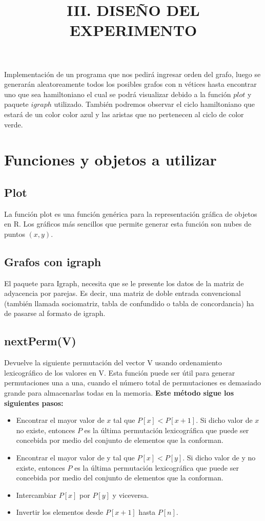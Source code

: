 \documentclass{article}
\title{III. DISEÑO DEL EXPERIMENTO}
\author{ }
\date{}
\begin{document}
\setlength{\parskip}{0mm}
\maketitle
Implementaci{\'o}n  de un programa que nos pedir{\'a} ingresar orden del grafo, luego
se generar{\'a}n aleatoreamente todos los posibles grafos con n v{\'e}tices hasta encontrar uno que sea hamiltoniano el cual se podr{\'a} visualizar debido a la funci{\'o}n $plot$ y paquete $igraph$ utilizado. También podremos observar el ciclo hamiltoniano que estar{\'a} de un color color azul y las aristas que no pertenecen al ciclo de color verde.

\section{Funciones y objetos a utilizar}
\subsection{Plot} La funci{\'o}n plot es una funci{\'o}n gen{\'e}rica para la representación gr{\'a}fica de objetos en R. Los gr{\'a}ficos m{\'a}s sencillos que permite generar esta funci{\'o}n son nubes de puntos $(x, y)$.
\subsection{Grafos con igraph}
El paquete para Igraph, necesita que se le presente los datos de la matriz de adyacencia por parejas. Es decir, una matriz de doble entrada convencional (tambi{\'e}n llamada sociomatriz, tabla de confundido o tabla de concordancia) ha de pasarse al formato de igraph.
\subsection{nextPerm(V)}
Devuelve la siguiente permutaci{\'o}n del vector V usando ordenamiento lexicogr{\'a}fico de los valores en V. 
 Esta funci{\'o}n puede ser {\'u}til para generar permutaciones una a una, cuando el n{\'u}mero total de permutaciones es demasiado grande para almacenarlas todas en la memoria.
 \newline  
 \newline
\textbf{Este m{\'e}todo sigue los siguientes pasos:}
\begin{itemize}
    \item Encontrar el mayor valor de $x$ tal que $P[x] < P[x+1]$. Si dicho valor de $x$ no existe, entonces $P$ es la {\'u}ltima permutaci{\'o}n lexicogr{\'a}fica que puede ser concebida por medio del conjunto de elementos que la conforman.
    \item Encontrar el mayor valor de y tal que $P[x]<P[y]$. Si dicho valor de y no existe, entonces $P$ es la {\'u}ltima permutaci{\'o}n lexicogr{\'a}fica que puede ser concebida por medio del conjunto de elementos que la conforman.
    \item Intercambiar $P[x]$ por $P[y]$ y viceversa.
    \item Invertir los elementos desde $P[x+1]$ hasta $P[n]$.

\end{itemize}
\end{document}

